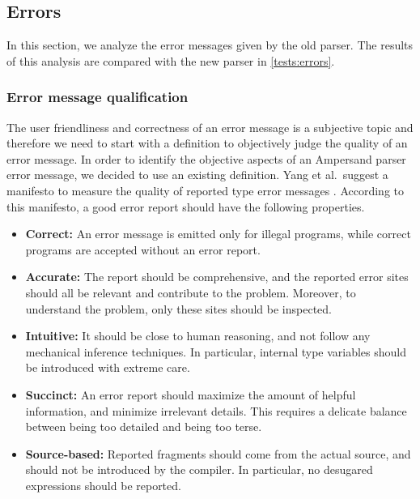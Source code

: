 
\subsection{Errors}
\label{analysis:errors}
In this section, we analyze the error messages given by the old parser.
The results of this analysis are compared with the new parser in \autoref{tests:errors}.

\subsubsection{Error message qualification}
The user friendliness and correctness of an error message is a subjective topic and therefore we need to start with a definition to objectively judge the quality of an error message.
In order to identify the objective aspects of an Ampersand parser error message, we decided to use an existing definition.
Yang et al.~suggest a manifesto to measure the quality of reported type error messages .
According to this manifesto, a good error report should have the following properties.
\begin{itemize}
  \item \textbf{Correct:} An error message is emitted only for illegal programs, while correct programs are accepted without an error report.
  \item \textbf{Accurate:} The report should be comprehensive, and the reported error sites should all be relevant and contribute to the problem. Moreover, to understand the problem, only these sites should be inspected.
  \item \textbf{Intuitive:} It should be close to human reasoning, and not follow any mechanical inference techniques. In particular, internal type variables should be introduced with extreme care.
  \item \textbf{Succinct:} An error report should maximize the amount of helpful information, and minimize irrelevant details. This requires a delicate balance between being too detailed and being too terse.
  \item \textbf{Source-based:} Reported fragments should come from the actual source, and should not be introduced by the compiler. In particular, no desugared expressions should be reported.
\end{itemize}

